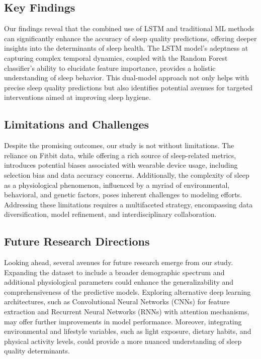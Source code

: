 \documentclass[10pt]{extarticle}
\begin{document}
\subsection{Key Findings}

Our findings reveal that the combined use of LSTM and traditional ML methods can significantly enhance the accuracy of sleep quality predictions, offering deeper insights into the determinants of sleep health. The LSTM model's adeptness at capturing complex temporal dynamics, coupled with the Random Forest classifier's ability to elucidate feature importance, provides a holistic understanding of sleep behavior. This dual-model approach not only helps with precise sleep quality predictions but also identifies potential avenues for targeted interventions aimed at improving sleep hygiene.

\subsection{Limitations and Challenges}

Despite the promising outcomes, our study is not without limitations. The reliance on Fitbit data, while offering a rich source of sleep-related metrics, introduces potential biases associated with wearable device usage, including selection bias and data accuracy concerns. Additionally, the complexity of sleep as a physiological phenomenon, influenced by a myriad of environmental, behavioral, and genetic factors, poses inherent challenges to modeling efforts. Addressing these limitations requires a multifaceted strategy, encompassing data diversification, model refinement, and interdisciplinary collaboration.

\subsection{Future Research Directions}

Looking ahead, several avenues for future research emerge from our study. Expanding the dataset to include a broader demographic spectrum and additional physiological parameters could enhance the generalizability and comprehensiveness of the predictive models. Exploring alternative deep learning architectures, such as Convolutional Neural Networks (CNNs) for feature extraction and Recurrent Neural Networks (RNNs) with attention mechanisms, may offer further improvements in model performance. Moreover, integrating environmental and lifestyle variables, such as light exposure, dietary habits, and physical activity levels, could provide a more nuanced understanding of sleep quality determinants.
\end{document}
